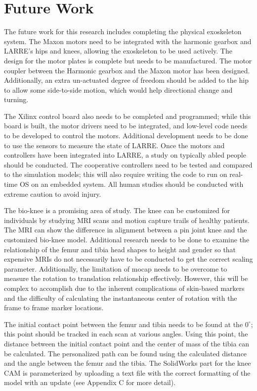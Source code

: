 \section{Future Work}

The future work for this research includes completing the physical exoskeleton system. The Maxon motors need to be integrated with the harmonic gearbox and LARRE's hips and knees, allowing the exoskeleton to be used actively. The design for the motor plates is complete but needs to be manufactured. The motor coupler between the Harmonic gearbox and the Maxon motor has been designed. Additionally, an extra un-actuated degree of freedom should be added to the hip to allow some side-to-side motion, which would help directional change and turning. 

The Xilinx control board also needs to be completed and programmed; while this board is built, the motor drivers need to be integrated, and low-level code needs to be developed to control the motors. Additional development needs to be done to use the sensors to measure the state of LARRE. Once the motors and controllers have been integrated into LARRE, a study on typically abled people should be conducted. The cooperative controllers need to be tested and compared to the simulation models; this will also require writing the code to run on real-time OS on an embedded system. All human studies should be conducted with extreme caution to avoid injury. 

The bio-knee is a promising area of study. The knee can be customized for individuals by studying MRI scans and motion capture trails of healthy patients. The MRI can show the difference in alignment between a pin joint knee and the customized bio-knee model. Additional research needs to be done to examine the relationship of the femur and tibia head shapes to height and gender so that expensive MRIs do not necessarily have to be conducted to get the correct scaling parameter. Additionally, the limitation of mocap needs to be overcome to measure the rotation to translation relationship effectively. However, this will be complex to accomplish due to the inherent complications of skin-based markers and the difficulty of calculating the instantaneous center of rotation with the frame to frame marker locations.  

The initial contact point between the femur and tibia needs to be found at the $0^{\circ}$; this point should be tracked in each scan at various angles. Using this point, the distance between the initial contact point and the center of mass of the tibia can be calculated. The personalized path can be found using the calculated distance and the angle between the femur and the tibia. The SolidWorks part for the knee CAM is parameterized by uploading a text file with the correct formatting of the model with an update (see Appendix C for more detail). 




